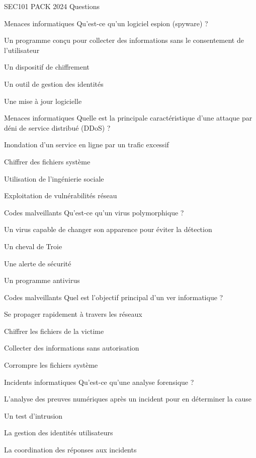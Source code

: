 \documentclass[12pt]{article}
\begin{document}
\begin{quiz}{SEC101 PACK 2024 Questions}
\begin{multi}[points=1]{Menaces informatiques}
Qu'est-ce qu'un logiciel espion (spyware) ?
    \item *Un programme conçu pour collecter des informations sans le consentement de l'utilisateur
    \item Un dispositif de chiffrement
    \item Un outil de gestion des identités
    \item Une mise à jour logicielle
\end{multi}

\begin{multi}[points=1]{Menaces informatiques}
Quelle est la principale caractéristique d'une attaque par déni de service distribué (DDoS) ?
    \item *Inondation d'un service en ligne par un trafic excessif
    \item Chiffrer des fichiers système
    \item Utilisation de l'ingénierie sociale
    \item Exploitation de vulnérabilités réseau
\end{multi}

\begin{multi}[points=1]{Codes malveillants}
Qu'est-ce qu'un virus polymorphique ?
    \item *Un virus capable de changer son apparence pour éviter la détection
    \item Un cheval de Troie
    \item Une alerte de sécurité
    \item Un programme antivirus
\end{multi}

\begin{multi}[points=1]{Codes malveillants}
Quel est l'objectif principal d'un ver informatique ?
    \item *Se propager rapidement à travers les réseaux
    \item Chiffrer les fichiers de la victime
    \item Collecter des informations sans autorisation
    \item Corrompre les fichiers système
\end{multi}

\begin{multi}[points=1]{Incidents informatiques}
Qu'est-ce qu'une analyse forensique ?
    \item *L'analyse des preuves numériques après un incident pour en déterminer la cause
    \item Un test d'intrusion
    \item La gestion des identités utilisateurs
    \item La coordination des réponses aux incidents
\end{multi}


\end{quiz}
\end{document}
